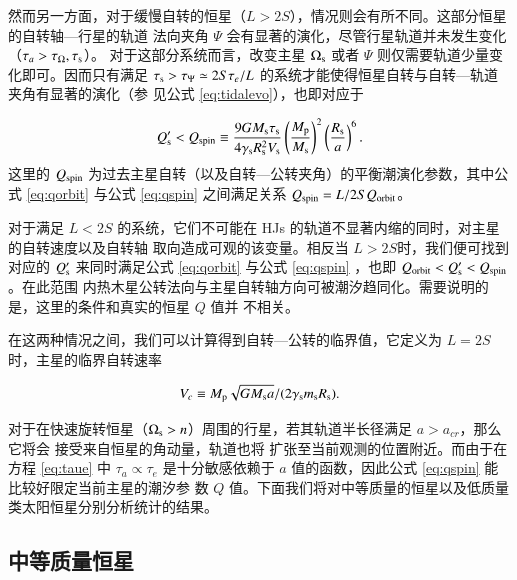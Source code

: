 然而另一方面，对于缓慢自转的恒星（$L>2S$），情况则会有所不同。这部分恒星的自转轴---行星的轨道
法向夹角 $\Psi$ 会有显著的演化，尽管行星轨道并未发生变化（$\tau_a >\tau_{\Omega},\tau_{\mathrm{s}}$）。
对于这部分系统而言，改变主星 $\Omega_\mathrm{s}$ 或者 $\Psi$ 则仅需要轨道少量变化即可。因而只有满足
$\tau_\mathrm{s}>\tau_\Psi \simeq 2S \tau_e/L$ 的系统才能使得恒星自转与自转---轨道夹角有显著的演化（参
见公式 \ref{eq:tidalevo}），也即对应于

\begin{equation}  \label{eq:qspin}
Q_\mathrm{s}^\prime < Q_{\rm spin} \equiv {9 G M_\mathrm{s} \tau_\mathrm{s} 
\over 4 \gamma_\mathrm{s} R_\mathrm{s}^2 V_\mathrm{s}} 
\left( {M_\mathrm{p} \over M_\mathrm{s}} \right)^2 
\left({R_\mathrm{s} \over a} \right)^{6}.
\end{equation} 
这里的 $Q_{\rm spin} $ 为过去主星自转（以及自转---公转夹角）的平衡潮演化参数，其中公式 \ref{eq:qorbit} 
与公式 \ref{eq:qspin} 之间满足关系 $Q_{\rm spin} = L/2S Q_{\rm orbit}$。

对于满足 $L< 2S$ 的系统，它们不可能在 HJs 的轨道不显著内缩的同时，对主星的自转速度以及自转轴
取向造成可观的该变量。相反当 $L>2S$时，我们便可找到对应的 $Q_\mathrm{s}^\prime $ 来同时满足公式 
\ref{eq:qorbit} 与公式 \ref{eq:qspin} ，也即 $Q_{\rm orbit} < Q_\mathrm{s}^\prime < Q_{\rm spin}$。在此范围
内热木星公转法向与主星自转轴方向可被潮汐趋同化。需要说明的是，这里的条件和真实的恒星 $Q$ 值并
不相关。

在这两种情况之间，我们可以计算得到自转---公转的临界值，它定义为 $L=2S $时，主星的临界自转速率

\begin{equation} \label{eq:vc}
V_c \equiv {M_\mathrm{p} {\sqrt{G M_\mathrm{s} a}} /( 2 \gamma_\mathrm{s} m_\mathrm{s}R_\mathrm{s}}).
\end{equation} 

对于在快速旋转恒星（$\Omega_\mathrm{s} > n$）周围的行星，若其轨道半长径满足 $a > a_{cr}$，那么它将会
接受来自恒星的角动量，轨道也将	扩张至当前观测的位置附近。而由于在方程 \ref{eq:taue} 中 $\tau_a 
\propto \tau_e$ 是十分敏感依赖于 $a$ 值的函数，因此公式 \ref{eq:qspin} 能比较好限定当前主星的潮汐参
数 $Q$ 值。下面我们将对中等质量的恒星以及低质量类太阳恒星分别分析统计的结果。

\subsection{中等质量恒星} \label{sec:hotstar}

